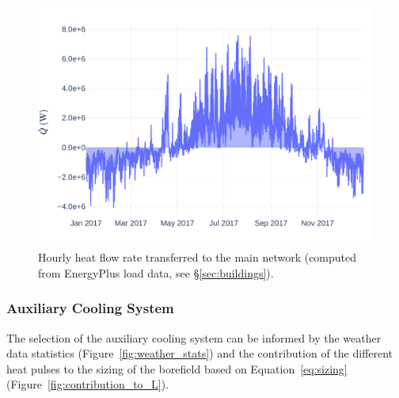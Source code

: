 \begin{figure}[!htbp]
    \centering
    \includegraphics[width=\linewidth]{../python_scripts/figures/QToGround.pdf}
    \caption{Hourly heat flow rate transferred to the main network (computed from EnergyPlus load data, see §\ref{sec:buildings}).}
    \label{fig:q_to_ground}
\end{figure}


\subsubsection{Auxiliary Cooling System} \label{sec:aux_cooling}

The selection of the auxiliary cooling system can be informed by the weather data statistics (Figure~\ref{fig:weather_stats}) and the contribution of the different heat pulses to the sizing of the borefield based on Equation~\ref{eq:sizing} (Figure~\ref{fig:contribution_to_L}).

